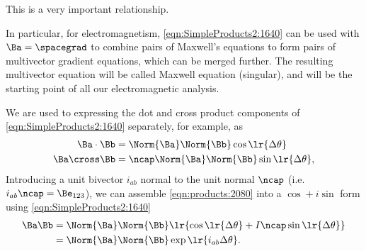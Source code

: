 This is a very important relationship.

In particular, for electromagnetism, \cref{eqn:SimpleProducts2:1640} can
be used with \( \Ba = \spacegrad \) to combine pairs of Maxwell's equations to form pairs of multivector gradient equations,
which can be merged further.
The resulting multivector equation will be
called
Maxwell equation (singular), and will be the starting point of all our electromagnetic analysis.

We are used to expressing the dot and cross product components of
\cref{eqn:SimpleProducts2:1640} separately, for example, as
\begin{equation}\label{eqn:products:2080}
\begin{aligned}
\Ba \cdot \Bb &= \Norm{\Ba} \Norm{\Bb} \cos\lr{ \Delta \theta } \\
\Ba \cross \Bb &= \ncap \Norm{\Ba} \Norm{\Bb} \sin\lr{ \Delta \theta },
\end{aligned}
\end{equation}
Introducing a unit bivector \( i_{ab} \) normal to the unit normal \( \ncap \)
(i.e. \( i_{ab} \ncap = \Be_{123} \)), we can assemble
\cref{eqn:products:2080} into a \( \cos + i \sin \) form using
\cref{eqn:SimpleProducts2:1640}
\begin{equation}\label{eqn:products:2100}
\begin{aligned}
\Ba \Bb &=
\Norm{\Ba} \Norm{\Bb} \lr{
\cos\lr{ \Delta \theta }
+
I \ncap
\sin\lr{ \Delta \theta }
} \\
&=
\Norm{\Ba} \Norm{\Bb} \exp\lr{ i_{ab} \Delta \theta }.
\end{aligned}
\end{equation}




